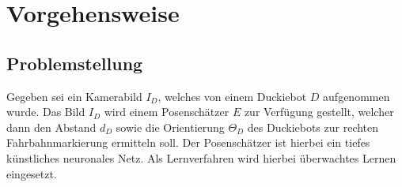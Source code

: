 
\chapter{Vorgehensweise}

\section{Problemstellung}

Gegeben sei ein Kamerabild $I_D$, welches von einem Duckiebot $D$ aufgenommen wurde. Das Bild $I_D$ wird einem Posenschätzer $E$ zur Verfügung gestellt, welcher dann den Abstand $d_D$ sowie die Orientierung $\Theta_D$ des Duckiebots zur rechten 
Fahrbahnmarkierung ermitteln soll. Der Posenschätzer ist hierbei ein tiefes künstliches neuronales Netz. Als Lernverfahren wird hierbei überwachtes Lernen eingesetzt.
